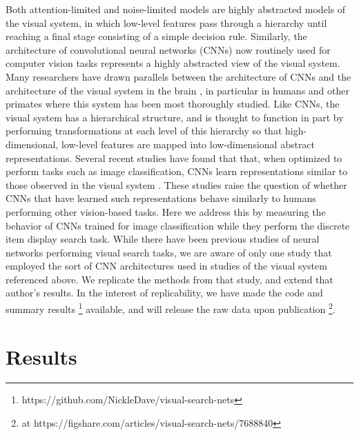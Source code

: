 \documentclass[10pt,letterpaper]{article}
\begin{document}
Both attention-limited and noise-limited models are highly abstracted models of the visual system,
in which low-level features pass through a hierarchy until reaching a final stage consisting of
a simple decision rule.
Similarly, the architecture of convolutional neural networks (CNNs) now routinely used for
computer vision tasks represents a highly abstracted view of the visual system.
Many researchers have drawn parallels between the architecture of CNNs and the 
architecture of the visual system in the brain \cite{kriegeskorteDeepNeuralNetworks2015}, 
in particular in humans and other primates where this system has been most thoroughly 
studied. Like CNNs, the visual system has a hierarchical structure, and is thought to 
function in part by performing transformations at each level of this hierarchy so that 
high-dimensional, low-level features are mapped into low-dimensional abstract 
representations. Several recent studies have found that that, when optimized to perform 
tasks such as image classification, CNNs learn representations similar to those 
observed in the visual system
\cite{yaminsUsingGoaldrivenDeep2016, yaminsPerformanceoptimizedHierarchicalModels2014}. 
These studies raise the question of whether CNNs that have learned such 
representations behave similarly to humans performing other vision-based tasks. 
Here we address this by measuring the behavior of CNNs trained for image classification 
while they perform the discrete item display search task.
While there have been previous studies of neural networks 
performing visual search tasks, we are aware of only one study \cite{poderCapacityLimitationsVisual2017} 
that employed the sort of CNN architectures used in studies of the visual system referenced above.
We replicate the methods from that study, and extend that author's results.
In the interest of replicability, we have made the code and summary results \footnote{https://github.com/NickleDave/visual-search-nets} 
available, and will release the raw data upon publication \footnote{at https://figshare.com/articles/visual-search-nets/7688840}.

\section{Results}
\end{document}
